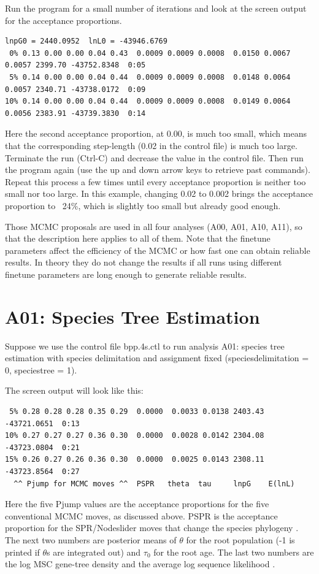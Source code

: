 \documentclass{book}
\numberwithin{equation}{section} \renewcommand{\baselinestretch}{0.55}
\begin{document}
Run the program for a small number of iterations and look at the
screen output for the acceptance proportions.
\begin{verbatim}
lnpG0 = 2440.0952  lnL0 = -43946.6769
 0% 0.13 0.00 0.00 0.04 0.43  0.0009 0.0009 0.0008  0.0150 0.0067 0.0057 2399.70 -43752.8348  0:05
 5% 0.14 0.00 0.00 0.04 0.44  0.0009 0.0009 0.0008  0.0148 0.0064 0.0057 2340.71 -43738.0172  0:09
10% 0.14 0.00 0.00 0.04 0.44  0.0009 0.0009 0.0008  0.0149 0.0064 0.0056 2383.91 -43739.3830  0:14
\end{verbatim}
Here the second acceptance proportion, at 0.00, is much too small,
which means that the corresponding step-length (0.02 in the control
file) is much too large.  Terminate the run (Ctrl-C) and decrease the
value in the control file.  Then run the program again (use the up and
down arrow keys to retrieve past commands).  Repeat this process a few
times until every acceptance proportion is neither too small nor too
large.  In this example, changing 0.02 to 0.002 brings the acceptance
proportion to ~24\%, which is slightly too small but already good
enough.

Those MCMC proposals are used in all four analyses (A00, A01, A10,
A11), so that the description here applies to all of them.  Note that
the finetune parameters affect the efficiency of the MCMC or how fast
one can obtain reliable results.  In theory they do not change the
results if all runs using different finetune parameters are long
enough to generate reliable results.


\section{A01: Species Tree Estimation}

Suppose we use the control file bpp.4s.ctl to run analysis A01:
species tree estimation with species delimitation and assignment fixed
(speciesdelimitation = 0, speciestree = 1).

The screen output will look like this:

\begin{verbatim}
 5% 0.28 0.28 0.28 0.35 0.29  0.0000  0.0033 0.0138 2403.43 -43721.0651  0:13
10% 0.27 0.27 0.27 0.36 0.30  0.0000  0.0028 0.0142 2304.08 -43723.0804  0:21
15% 0.26 0.27 0.26 0.36 0.30  0.0000  0.0025 0.0143 2308.11 -43723.8564  0:27
  ^^ Pjump for MCMC moves ^^  PSPR   theta  tau     lnpG    E(lnL)
\end{verbatim}

Here the five Pjump values are the acceptance proportions for the five
conventional MCMC moves, as discussed above.  PSPR is the acceptance
proportion for the SPR/Nodeslider moves that change the species
phylogeny \cite{Rannala2017}.  The next two numbers are posterior
means of $\theta$ for the root population (-1 is printed if $\theta$s
are integrated out) and $\tau_0$ for the root age.  The last two
numbers are the log MSC gene-tree density \citep{Rannala2003} and the
average log sequence likelihood \cite{Felsenstein1981}.
\end{document}
